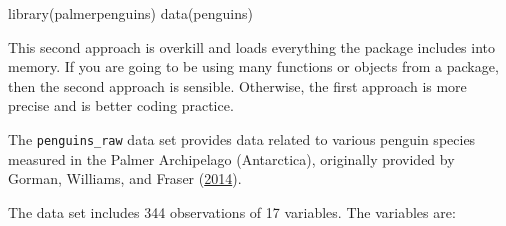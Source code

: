 \documentclass[
]{book}
\newenvironment{Shaded}{\begin{snugshade}}{\end{snugshade}}
\newcommand{\FunctionTok}[1]{\textcolor[rgb]{0.00,0.00,0.00}{#1}}
\newcommand{\NormalTok}[1]{#1}
\theoremstyle{definition}
\theoremstyle{definition}
\theoremstyle{definition}
\theoremstyle{definition}
\theoremstyle{remark}
\begin{document}
\begin{Shaded}
\begin{Highlighting}[]
\FunctionTok{library}\NormalTok{(palmerpenguins)}
\FunctionTok{data}\NormalTok{(penguins)}
\end{Highlighting}
\end{Shaded}

This second approach is overkill and loads everything the package includes into memory. If you are going to be using many functions or objects from a package, then the second approach is sensible. Otherwise, the first approach is more precise and is better coding practice.

The \texttt{penguins\_raw} data set provides data related to various penguin species measured in the Palmer Archipelago (Antarctica), originally provided by Gorman, Williams, and Fraser (\protect\hyperlink{ref-GormanEtAl2014}{2014}).

The data set includes 344 observations of 17 variables. The variables are:
\end{document}
